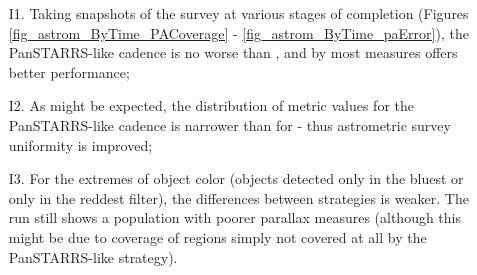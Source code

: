 \begin{itemize}
  \item[I1.] Taking snapshots of the survey at various stages of completion (Figures \ref{fig_astrom_ByTime_PACoverage} -  \ref{fig_astrom_ByTime_paError}), the PanSTARRS-like cadence is no worse than , and by most measures offers better performance;
\item[I2.] As might be expected, the distribution of metric values for the PanSTARRS-like cadence is narrower than for  - thus astrometric survey uniformity is improved; 
\item[I3.] For the extremes of object color (objects detected only in the bluest or only in the reddest filter), the differences between strategies is weaker. The run  still shows a population with poorer parallax measures (although this might be due to coverage of regions simply not covered at all by the PanSTARRS-like strategy).
\end{itemize}

